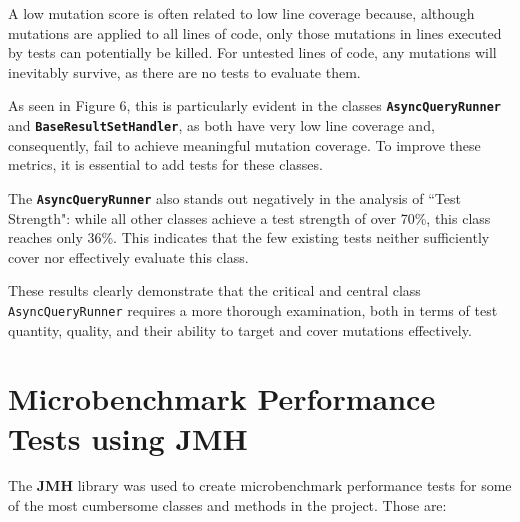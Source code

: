 \documentclass[sigconf]{acmart}
\begin{document}
A low mutation score is often related to low line coverage because, although mutations are applied to all lines of code, only those mutations in lines executed by tests can potentially be killed. For untested lines of code, any mutations will inevitably survive, as there are no tests to evaluate them.

\vspace{0.5cm}

As seen in Figure 6, this is particularly evident in the classes \texttt{\textbf{AsyncQueryRunner}} and \texttt{\textbf{BaseResultSetHandler}}, as both have very low line coverage and, consequently, fail to achieve meaningful mutation coverage. To improve these metrics, it is essential to add tests for these classes.

\vspace{0.5cm}

The \texttt{\textbf{AsyncQueryRunner}} also stands out negatively in the analysis of “Test Strength": while all other classes achieve a test strength of over 70\%, this class reaches only 36\%. This indicates that the few existing tests neither sufficiently cover nor effectively evaluate this class.

These results clearly demonstrate that the critical and central class \texttt{AsyncQueryRunner} requires a more thorough examination, both in terms of test quantity, quality, and their ability to target and cover mutations effectively.

\section{Microbenchmark Performance Tests using JMH}

The \textbf{JMH} library was used to create microbenchmark performance tests for some of the most cumbersome classes and methods in the project. Those are:
\end{document}
